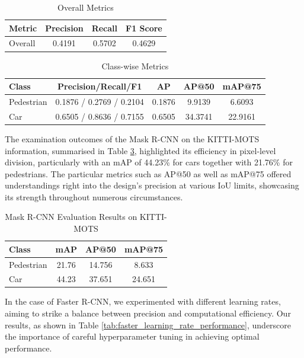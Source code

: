 \documentclass{IEEEtran}
\begin{document}
	\begin{table}[h]
		\centering
		\begin{tabular}{lccc}
			\toprule
			Metric & Precision & Recall & F1 Score \\
			\midrule
			Overall & 0.4191 & 0.5702 & 0.4629 \\
			\bottomrule
		\end{tabular}
		\caption{Overall Metrics}
		\label{tab:overall_metrics} 
	\end{table}
	
	\begin{table}[ht]
		\centering
		\begin{tabular}{lcccc}
			\toprule
			Class & Precision/Recall/F1 & AP & AP@50 & mAP@75 \\
			\midrule
			Pedestrian & 0.1876 / 0.2769 / 0.2104 & 0.1876 & 9.9139 & 6.6093 \\
			Car & 0.6505 / 0.8636 / 0.7155 & 0.6505 & 34.3741 & 22.9161 \\
			\bottomrule
		\end{tabular}
		\caption{Class-wise Metrics}
		\label{tab:class_metrics}
	\end{table}
	
	The examination outcomes of the Mask R-CNN on the KITTI-MOTS information, summarised in Table \ref{tab:mask_rcnn_results}, highlighted its efficiency in pixel-level division, particularly with an mAP of 44.23\% for cars together with 21.76\% for pedestrians. The particular metrics such as AP@50 as well as mAP@75 offered understandings right into the design's precision at various IoU limits, showcasing its strength throughout numerous circumstances.
	
	
	\begin{table}[ht]
		\centering
		\begin{tabular}{lccc}
			\toprule
			Class & mAP & AP@50 & mAP@75 \\
			\midrule
			Pedestrian & 21.76 & 14.756 & 8.633 \\
			Car & 44.23 & 37.651 & 24.651 \\
			\bottomrule
		\end{tabular}
		\caption{Mask R-CNN Evaluation Results on KITTI-MOTS}
		\label{tab:mask_rcnn_results}
	\end{table}
	
	In the case of Faster R-CNN, we experimented with different learning rates, aiming to strike a balance between precision and computational efficiency. Our results, as shown in Table \ref{tab:faster_learning_rate_performance}, underscore the importance of careful hyperparameter tuning in achieving optimal performance. 
	
\end{document}

